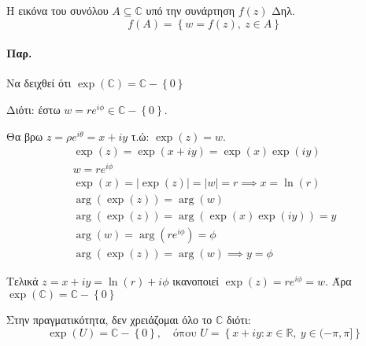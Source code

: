 \documentclass[12pt,a4paper,titlepage,fleqn]{article}
\begin{document}
\begin{enumparen}{}
    	Η εικόνα του συνόλου \( A \subseteq \mathbb C  \) υπό την συνάρτηση \( f(z) \)
    	Δηλ.
    	\[ f(A)=\left\lbrace w=f(z),\ z\in A \right\rbrace \]
    	\paragraph{Παρ.} Να δειχθεί ότι \( \exp(\mathbb C ) =
    	\mathbb C -\left\lbrace 0 \right\rbrace \)

    	Διότι: έστω \( w=re^{i\phi}\in\mathbb C -\left\lbrace 0 \right\rbrace \).

    	Θα βρω \( z=\rho e^{i\theta}=x+iy \) τ.ώ: \( \exp(z)=w \).
    	\begin{gather*}
    	\exp(z)=\exp(x+iy) = \exp(x)\exp(iy) \\
    	w=re^{i\phi} \\
    	\exp(x) = \left|\exp(z)\right|=|w|=r \implies \boxed{x = \ln(r)} \\[.5pt]
    	\arg\left( \exp(z) \right) = \arg(w) \\
    	\arg\left(\exp(z)\right) = \arg\left(\exp(x)\exp(iy)\right) = y \\
    	\arg(w)=\arg(re^{i\phi}) = \phi \\
        \arg\left(\exp(z)\right)=\arg(w) \implies \boxed{y=\phi}
    	\end{gather*}

    	Τελικά \( z=x+iy = \ln(r)+i\phi \) ικανοποιεί \( \exp(z)=re^{i\phi}=w \).
    	Άρα \( \exp(\mathbb C)=\mathbb C-\left\lbrace 0 \right\rbrace \)

    	Στην πραγματικότητα, δεν χρειάζομαι όλο το \( \mathbb C \) διότι:
    	\[
    	\exp(U) = \mathbb C-\left\lbrace 0 \right\rbrace,\quad
    	\text{όπου } U = \left\lbrace
    	    x+iy:x\in\mathbb R,\ y\in(-\pi,\pi]
    	 \right\rbrace
    	\]

    \end{enumparen}
    
\end{document}
